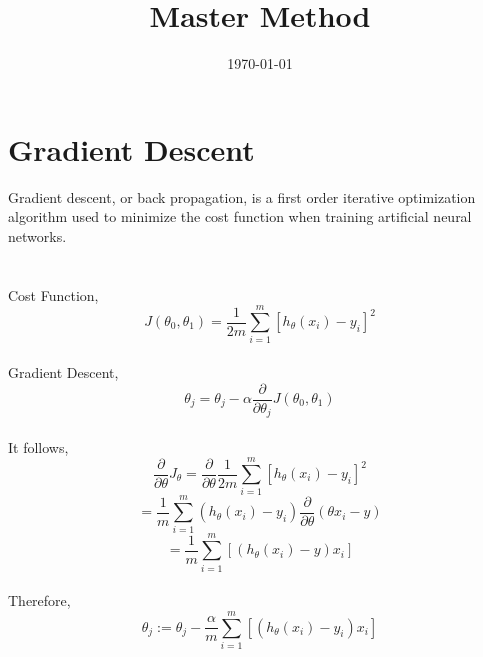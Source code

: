 \documentclass[a4paper, 12pt]{article}
\begin{document}
\title{Master Method}
\date{\today}
\section{Gradient Descent}
	Gradient descent, or back propagation, is a first order iterative optimization algorithm used to minimize the cost function when training artificial neural networks.\\
	\\
	\\
	Cost Function, $$J(\theta_0, \theta_1) = \frac{1}{2m} \sum_{i=1}^{m} [h_\theta (x_i) - y_i]^2 $$
	\\
	Gradient Descent,
	$$\theta_j = \theta_j - \alpha \frac{\partial}{\partial \theta_j} J(\theta_0, \theta_1)
	$$
	\\
	It follows,
	$$\frac{\partial}{\partial \theta} J_\theta = \frac{\partial}{\partial \theta} \frac{1}{2m} \sum_{i=1}^{m} [h_\theta (x_i) - y_i]^2
	$$
	$$= \frac{1}{m} \sum_{i=1}^{m} (h_\theta (x_i) - y_i) \frac{\partial}{\partial \theta} (\theta x_i - y)
	$$
	$$= \frac{1}{m} \sum_{i=1}^{m} [(h_\theta (x_i) - y) x_i]
	$$
	\\
	Therefore,
	$$ \theta_j := \theta_j - \frac{\alpha}{m} \sum_{i=1}^{m}[(h_\theta(x_i) - y_i) x_i]
	$$
\end{document}
